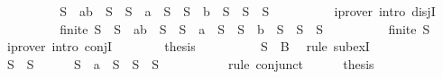 \begin{isabellebody}
\ \ \ \ \ \ \isamarkupfalse%
\ \isamarkupfalse%
\ {\isachardoublequoteopen}S\ {\isacharequal}\ {\isacharbraceleft}a{\isacharcomma}b{\isacharbraceright}\ {\isasymunion}\ S{}\ {\isasymor}\ S\ {\isacharequal}\ {\isacharbraceleft}a{\isacharbraceright}\ {\isasymunion}\ S{}\ {\isasymor}\ S\ {\isacharequal}\ {\isacharbraceleft}b{\isacharbraceright}\ {\isasymunion}\ S{}\ {\isasymor}\ S\ {\isacharequal}\ S{}{\isachardoublequoteclose}\isanewline
\ \ \ \ \ \ \ \ \isamarkupfalse%
\ {\isacharparenleft}iprover\ intro{\isacharcolon}\ disjI{}{\isacharparenright}\isanewline
\ \ \ \ \ \ \isamarkupfalse%
\ \isamarkupfalse%
\ {\isachardoublequoteopen}finite\ S{}\ {\isasymand}\ {\isacharparenleft}S\ {\isacharequal}\ {\isacharbraceleft}a{\isacharcomma}b{\isacharbraceright}\ {\isasymunion}\ S{}\ {\isasymor}\ S\ {\isacharequal}\ {\isacharbraceleft}a{\isacharbraceright}\ {\isasymunion}\ S{}\ {\isasymor}\ S\ {\isacharequal}\ {\isacharbraceleft}b{\isacharbraceright}\ {\isasymunion}\ S{}\ {\isasymor}\ S\ {\isacharequal}\ S{}{\isacharparenright}{\isachardoublequoteclose}\isanewline
\ \ \ \ \ \ \ \ \isamarkupfalse%
\ {\isacartoucheopen}finite\ S{}{\isacartoucheclose}\ \isamarkupfalse%
\ {\isacharparenleft}iprover\ intro{\isacharcolon}\ conjI{\isacharparenright}\isanewline
\ \ \ \ \ \ \isamarkupfalse%
\ {\isacharquery}thesis\isanewline
\ \ \ \ \ \ \ \ \isamarkupfalse%
\ {\isacartoucheopen}S{}\ {\isasymsubseteq}\ B{\isacartoucheclose}\ \isamarkupfalse%
\ {\isacharparenleft}rule\ subexI{\isacharparenright}\isanewline
\ \ \ \ \isamarkupfalse%
\isanewline
\ \ \isamarkupfalse%
\isanewline
\ \ \ \ \isamarkupfalse%
\ {\isachardoublequoteopen}S{}\ {\isacharequal}\ S{}{\isachardoublequoteclose}\isanewline
\ \ \ \ \isamarkupfalse%
\ {\isachardoublequoteopen}S\ {\isacharequal}\ {\isacharbraceleft}a{\isacharbraceright}\ {\isasymunion}\ S{}\ {\isasymor}\ S\ {\isacharequal}\ S{}{\isachardoublequoteclose}\isanewline
\ \ \ \ \ \ \isamarkupfalse%
\ {}\ \isamarkupfalse%
\ {\isacharparenleft}rule\ conjunct{}{\isacharparenright}\isanewline
\ \ \ \ \isamarkupfalse%
\ {\isacharquery}thesis\isanewline
\ \ \ \ \isamarkupfalse%

\end{isabellebody}
